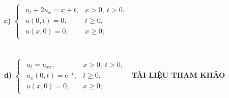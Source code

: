 \documentclass[10pt, a4paper]{article}
\begin{document}
	\textbf{c) }$\begin{cases}
	\begin{array}{ll}
		u_t+2u_x=x+t, & x>0,~t>0, \\
		u(0,t)=0, & t\ge0,\\
		u(x,0)=0, & x\ge0;
	\end{array}
	\end{cases}$\\\\\\
	\textbf{d) }$\begin{cases}
	\begin{array}{ll}
		u_t=u_{xx}, & x>0,~t>0, \\
		u_x(0,t)=\mathrm e^{-t}, & t\ge0,\\
		u(x,0)=0, & x\ge0;
	\end{array}
	\end{cases}$
\newpage
\large\textbf{TÀI LIỆU THAM KHẢO}
\end{document}
